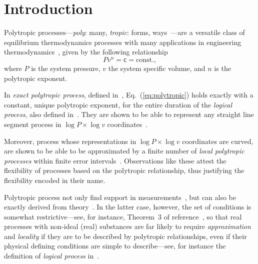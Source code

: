 \section{Introduction}

    Polytropic        processes---\emph{poly}:        many,        \emph{tropic}:         forms,
    ways~\cite{2020-NaaktgeborenC-engrXiv}---are a versatile class of equilibrium thermodynamics
    processes          with          many          applications          in          engineering
    thermodynamics~\cite{2002-MoranMJ+ShapiroHN-LTC,                 2013-CengelYA+BolesMA-AMGH,
    2015-KroosKA+PotterMC-Cengage,  1986-JonesJB+HawkinsGA-Wiley},  given   by   the   following
    relationship
    \begin{equation}
        Pv^n = \mathsf{c} = \mbox{const.},
        \label{eq:polytropic}
    \end{equation}
    \noindent where $P$ is the system pressure, $v$ the system specific volume, and $n$  is  the
    polytropic exponent.

    In   \emph{exact   polytropic   process},   defined    in~\cite{2020-NaaktgeborenC-engrXiv},
    Eq.~(\ref{eq:polytropic}) holds exactly with a constant, unique polytropic exponent, for the
    entire     duration     of      the      \emph{logical      process},      also      defined
    in~\cite{2020-NaaktgeborenC-engrXiv}. They are shown to be able to  represent  any  straight
    line      segment      process       in       $\log       P       \times       \log       v$
    coordinates~\cite{2020-NaaktgeborenC-engrXiv}.

    Moreover, process whose representations in $\log P \times \log v$  coordinates  are  curved,
    are shown to be able to be  approximated  by  a  finite  number  of  \emph{local  polytropic
    processes} within  finite  error  intervals~\cite{2020-NaaktgeborenC-engrXiv}.  Observations
    like these attest the flexibility of processes based on the  polytropic  relationship,  thus
    justifying the flexibility encoded in their name.

    Polytropic process not only find support  in  measurements~\cite{2013-CengelYA+BolesMA-AMGH,
    2002-MoranMJ+ShapiroHN-LTC,  1985-WylenG-Wiley},  but  can  also  be  exactly  derived  from
    theory~\cite{2012-ChristiansJ-IntJMechEngEduc, 2020-NaaktgeborenC-engrXiv}.  In  the  latter
    case, however, the set of conditions is somewhat restrictive---see, for instance,  Theorem~3
    of reference~\cite{2020-NaaktgeborenC-engrXiv}, so that real processes with non-ideal (real)
    substances are far likely to require \emph{approximation} and \emph{locality} if they are to
    be described by polytropic relationships, even if their  physical  defining  conditions  are
    simple  to  describe---see,  for  instance  the   definition   of   \emph{logical   process}
    in~\cite{2020-NaaktgeborenC-engrXiv}.

